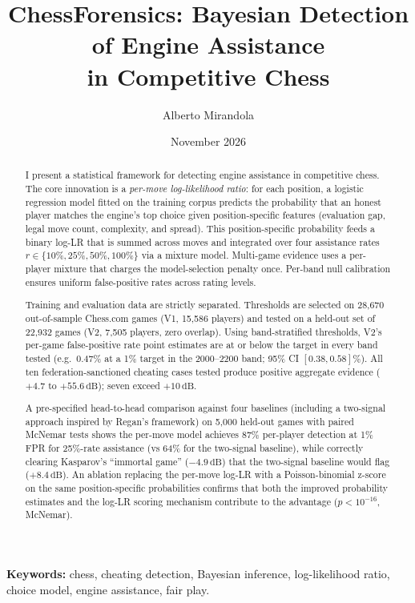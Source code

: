 \documentclass[11pt,a4paper]{article}
\title{%
  \textbf{ChessForensics: Bayesian Detection of Engine Assistance\\
  in Competitive Chess}%
}
\author{%
  Alberto Mirandola%
}
\date{November 2026}
\newcommand{\dB}{\,\mathrm{dB}}
\theoremstyle{definition}
\begin{document}
\maketitle

\begin{abstract}
I present a statistical framework for detecting engine assistance in
competitive chess.  The core innovation is a \emph{per-move log-likelihood
ratio}: for each position, a logistic regression model fitted on the
training corpus predicts the probability that an honest player matches
the engine's top choice given position-specific features (evaluation gap,
legal move count, complexity, and spread).  This position-specific
probability feeds a binary log-LR that is summed across moves and
integrated over four assistance rates
$r \in \{10\%, 25\%, 50\%, 100\%\}$ via a mixture model.
Multi-game evidence uses a per-player mixture that charges the
model-selection penalty once.  Per-band null calibration ensures
uniform false-positive rates across rating levels.

Training and evaluation data are strictly separated.  Thresholds
are selected on 28{,}670 out-of-sample Chess.com games (V1,
15{,}586 players) and tested on a held-out set of 22{,}932 games
(V2, 7{,}505 players, zero overlap).  Using band-stratified
thresholds, V2's per-game false-positive rate point estimates are
at or below the target in every band tested (e.g.\ 0.47\% at a 1\%
target in the 2000--2200 band; 95\% CI $[0.38, 0.58]\%$).
All ten federation-sanctioned cheating cases tested produce positive
aggregate evidence ($+4.7$ to $+55.6\dB$); seven exceed $+10\dB$.

A pre-specified head-to-head comparison against four baselines
(including a two-signal approach inspired by Regan's framework)
on 5{,}000 held-out games with paired McNemar tests shows the
per-move model achieves 87\% per-player detection at 1\% FPR for
25\%-rate assistance (vs 64\% for the two-signal baseline), while
correctly clearing Kasparov's ``immortal game'' ($-4.9\dB$) that
the two-signal baseline would flag ($+8.4\dB$).  An ablation
replacing the per-move log-LR with a Poisson-binomial z-score on
the same position-specific probabilities confirms that both the
improved probability estimates and the log-LR scoring mechanism
contribute to the advantage ($p < 10^{-16}$, McNemar).
\end{abstract}

\medskip
\noindent\textbf{Keywords:} chess, cheating detection, Bayesian inference,
log-likelihood ratio, choice model, engine assistance, fair play.
\end{document}

